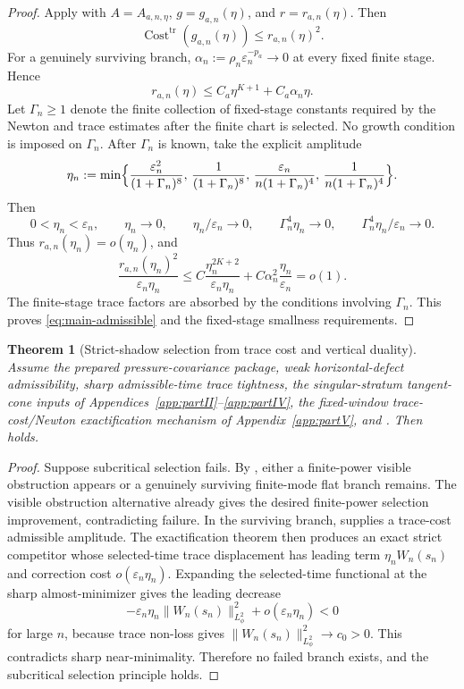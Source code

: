 \documentclass[11pt]{article}
\numberwithin{equation}{section}
\theoremstyle{plain}
\newtheorem{theorem}{Theorem}[section]
\theoremstyle{definition}
\theoremstyle{remark}
\DeclareMathOperator{\Cost}{Cost}
\newcommand{\eps}{\varepsilon}
\newcommand{\tr}{\operatorname{tr}}
\begin{document}
\begin{proof}
Apply  with \(A=A_{a,n,\eta}\), \(g=g_{a,n}(\eta)\), and \(r=r_{a,n}(\eta)\).  Then
\[
        \Cost^{\tr}(g_{a,n}(\eta))\le r_{a,n}(\eta)^2.
\]
For a genuinely surviving branch, \(\alpha_n:=\rho_n\eps_n^{-p_a}\to0\) at every fixed finite stage.  Hence
\[
        r_{a,n}(\eta)\le C_a\eta^{K+1}+C_a\alpha_n\eta.
\]
Let \(\Gamma_n\ge1\) denote the finite collection of fixed-stage constants required by the Newton and trace estimates after the finite chart is selected.  No growth condition is imposed on \(\Gamma_n\).  After \(\Gamma_n\) is known, take the explicit amplitude
\[
        \eta_n
        :=\min\Bigl\{
        \frac{\eps_n^2}{(1+\Gamma_n)^8},\,
        \frac{1}{(1+\Gamma_n)^8},\,
        \frac{\eps_n}{n(1+\Gamma_n)^4},\,
        \frac{1}{n(1+\Gamma_n)^4}
        \Bigr\}.
\]
Then
\[
        0<\eta_n<\eps_n,
        \qquad \eta_n\to0,
        \qquad \eta_n/\eps_n\to0,
        \qquad \Gamma_n^4\eta_n\to0,
        \qquad \Gamma_n^4\eta_n/\eps_n\to0.
\]
Thus \(r_{a,n}(\eta_n)=o(\eta_n)\), and
\[
        \frac{r_{a,n}(\eta_n)^2}{\eps_n\eta_n}
        \le C\frac{\eta_n^{2K+2}}{\eps_n\eta_n}
        +C\alpha_n^2\frac{\eta_n}{\eps_n}
        =o(1).
\]
The finite-stage trace factors are absorbed by the conditions involving \(\Gamma_n\).  This proves \eqref{eq:main-admissible} and the fixed-stage smallness requirements.
\end{proof}

\begin{theorem}[Strict-shadow selection from trace cost and vertical duality]\label{thm:main-selection}
Assume the prepared pressure-covariance package, weak horizontal-defect admissibility, sharp admissible-time trace tightness, the singular-stratum tangent-cone inputs of Appendices~\ref{app:partII}--\ref{app:partIV}, the fixed-window trace-cost/Newton exactification mechanism of Appendix~\ref{app:partV}, and .  Then  holds.
\end{theorem}

\begin{proof}
Suppose subcritical selection fails.  By , either a finite-power visible obstruction appears or a genuinely surviving finite-mode flat branch remains.  The visible obstruction alternative already gives the desired finite-power selection improvement, contradicting failure.  In the surviving branch,  supplies a trace-cost admissible amplitude.  The exactification theorem then produces an exact strict competitor whose selected-time trace displacement has leading term \(\eta_n W_n(s_n)\) and correction cost \(o(\eps_n\eta_n)\).  Expanding the selected-time functional at the sharp almost-minimizer gives the leading decrease
\[
        -\eps_n\eta_n\|W_n(s_n)\|_{L^2_\phi}^2+o(\eps_n\eta_n)<0
\]
for large \(n\), because trace non-loss gives \(\|W_n(s_n)\|_{L^2_\phi}^2\to c_0>0\).  This contradicts sharp near-minimality.  Therefore no failed branch exists, and the subcritical selection principle holds.
\end{proof}
\end{document}

